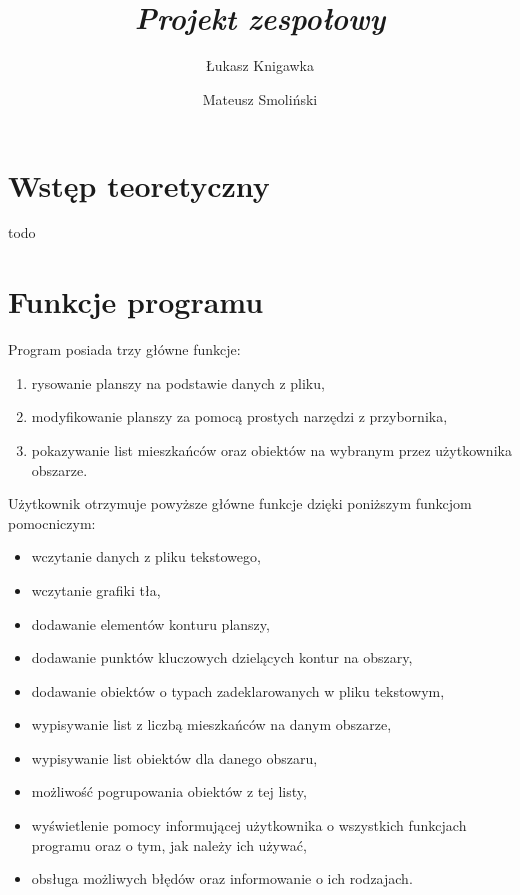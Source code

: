 \documentclass[a4paper,12pt]{article}
\title{ \sc{Specyfikacja funkcjonalna} \\
\emph{Projekt zespołowy} }
\author{Łukasz Knigawka \and Mateusz Smoliński}
\newcommand\tab[1][0.6cm]{\hspace*{#1} }
\begin{document}
\maketitle

\thispagestyle{empty}

\tableofcontents

\newpage

\section{Wstęp teoretyczny}

todo


\section{Funkcje programu}

\tab Program posiada trzy główne funkcje:
\begin{enumerate}
\item rysowanie planszy na podstawie danych z pliku,
\item modyfikowanie planszy za pomocą prostych narzędzi z przybornika,
\item pokazywanie list mieszkańców oraz obiektów na wybranym przez użytkownika obszarze.
\end{enumerate}
\tab Użytkownik otrzymuje powyższe główne funkcje dzięki poniższym funkcjom pomocniczym:
\begin{itemize}
\item wczytanie danych z pliku tekstowego,
\item wczytanie grafiki tła,
\item dodawanie elementów konturu planszy,
\item dodawanie punktów kluczowych dzielących kontur na obszary,
\item dodawanie obiektów o typach zadeklarowanych w pliku tekstowym,
\item wypisywanie list z liczbą mieszkańców na danym obszarze,
\item wypisywanie list obiektów dla danego obszaru,
\item możliwość pogrupowania obiektów z tej listy,
\item wyświetlenie pomocy informującej użytkownika o wszystkich funkcjach programu oraz o tym, jak należy ich używać,
\item obsługa możliwych błędów oraz informowanie o ich rodzajach.
\end{itemize}
\end{document}
